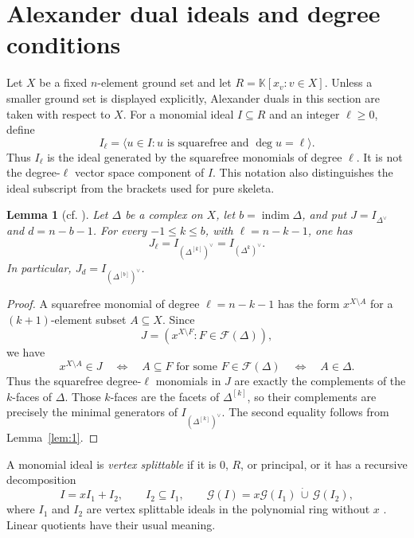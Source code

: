 \documentclass[11pt]{amsart}
\newcommand{\K}{\mathbb K}
\newcommand{\F}{\mathcal F}
\DeclareMathOperator{\indim}{indim}
\newtheorem{lemma}[theorem]{Lemma}
\theoremstyle{definition}
\begin{document}
	\section{Alexander dual ideals and degree conditions}\label{sec:6}
	
	Let $X$ be a fixed $n$-element ground set and let $R=\K[x_v:v\in X]$. Unless a smaller ground set is displayed explicitly, Alexander duals in this section are taken with respect to $X$. For a monomial ideal $I\subseteq R$ and an integer $\ell\geq0$, define
	\[
	I_{\ell}
	=\bigl\langle u\in I:u\text{ is squarefree and }\deg u=\ell\bigr\rangle.
	\]
	Thus $I_{\ell}$ is the ideal generated by the squarefree monomials of degree $\ell$.  It is not the degree-$\ell$ vector space component of $I$.  This notation also distinguishes the ideal subscript from the brackets used for pure skeleta.
	
	\begin{lemma}[cf. {\cite[Lemma 4.1]{Namiq2026ICM}}]\label{lem:8}
		Let $\Delta$ be a complex on $X$, let $b=\indim\Delta$, and put $J=I_{\Delta^{\vee}}$ and $d=n-b-1$. For every $-1\leq k\leq b$, with $\ell=n-k-1$, one has
		\[
		J_{\ell}=I_{(\Delta^{[k]})^{\vee}}
		=I_{(\Delta^k)^{\vee}}.
		\]
		In particular, $J_d=I_{(\Delta^{[b]})^{\vee}}$.
	\end{lemma}
	
	\begin{proof}
		A squarefree monomial of degree $\ell=n-k-1$ has the form $x^{X\setminus A}$ for a $(k+1)$-element subset $A\subseteq X$.  Since
		\[
		J=(x^{X\setminus F}:F\in\F(\Delta)),
		\]
		we have
		\[
		x^{X\setminus A}\in J
		\quad\Longleftrightarrow\quad
		A\subseteq F\text{ for some }F\in\F(\Delta)
		\quad\Longleftrightarrow\quad
		A\in\Delta.
		\]
		Thus the squarefree degree-$\ell$ monomials in $J$ are exactly the complements of the $k$-faces of $\Delta$.  Those $k$-faces are the facets of $\Delta^{[k]}$, so their complements are precisely the minimal generators of $I_{(\Delta^{[k]})^{\vee}}$.  The second equality follows from Lemma~\ref{lem:1}.
	\end{proof}
	
	A monomial ideal is \emph{vertex splittable} if it is $0$, $R$, or principal, or it has a recursive decomposition
	\[
	I=xI_1+I_2,
	\qquad I_2\subseteq I_1,
	\qquad
	\mathcal G(I)=x\mathcal G(I_1)\,\dot\cup\,\mathcal G(I_2),
	\]
	where $I_1$ and $I_2$ are vertex splittable ideals in the polynomial ring without $x$ \cite{MoradiKhoshAhang2016}.  Linear quotients have their usual meaning.
	
\end{document}
